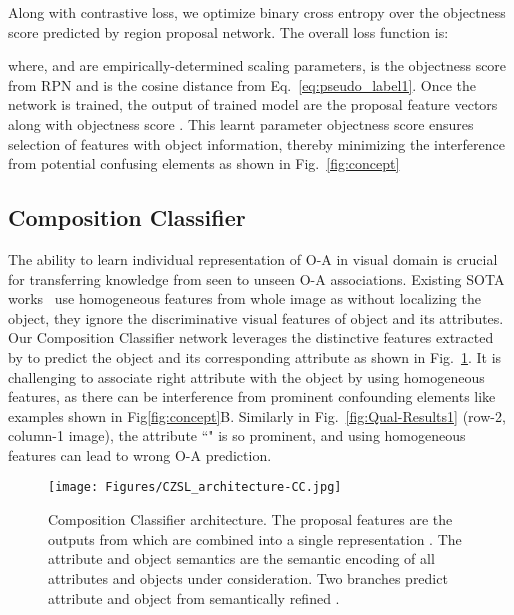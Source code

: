 \documentclass{bmvc2k}
\begin{document}
Along with contrastive loss, we optimize binary cross entropy over the objectness score predicted by region proposal network. The overall loss function is:

where,  and  are empirically-determined scaling parameters,  is the objectness score from RPN and  is the cosine distance from Eq.~\ref{eq:pseudo_label1}. Once the  network is trained, the output of trained model are the proposal feature vectors  along with objectness score . This learnt parameter objectness score ensures selection of features with object information, thereby minimizing the interference from potential confusing elements as shown in Fig.~\ref{fig:concept}


\vspace{-0.2cm}
\subsection{Composition Classifier }\label{section:CCL}
\vspace{-0.15cm}
 The ability to learn individual representation of O-A in visual domain is crucial for transferring knowledge from seen to unseen O-A associations. Existing SOTA works~\cite{naeem2021learning,mancini2021learning,mancini2021open,ruis2021independent,xu2021zero} use homogeneous features from whole image as without localizing the object, they ignore the discriminative visual features of object and its attributes. Our Composition Classifier network  leverages the distinctive features extracted by  to predict the object and its corresponding attribute as shown in Fig.~\ref{fig:CC}.
 It is challenging to associate right attribute with the object by using homogeneous features, as there can be interference from prominent confounding elements like examples shown in Fig\ref{fig:concept}B. Similarly in Fig.~\ref{fig:Qual-Results1} (row-2, column-1 image), the attribute ``" is so prominent, and using homogeneous features can lead to wrong O-A prediction.
\begin{figure}
    \centering
    \texttt{[image: Figures/CZSL\_architecture-CC.jpg]}
    \vspace{-0.2cm}
    \caption{Composition Classifier  architecture. The proposal features  are the outputs from  which are combined into a single representation . The attribute and object semantics are the semantic encoding of all attributes and objects under consideration. Two branches predict attribute and object from semantically refined .}
    \vspace{-0.4cm}
    \label{fig:CC}
\end{figure}
\end{document}
